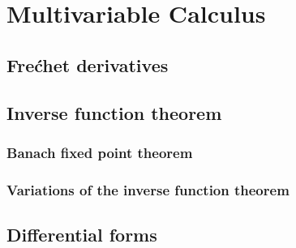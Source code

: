 \documentclass{../note}
\begin{document}
\section{}


\chapter{}





\part{Multivariable Calculus}
\chapter{Fre\'chet derivatives}
\section{}


\chapter{Inverse function theorem}
\section{Banach fixed point theorem}
\section{Variations of the inverse function theorem}




\chapter{Differential forms}
\end{document}
